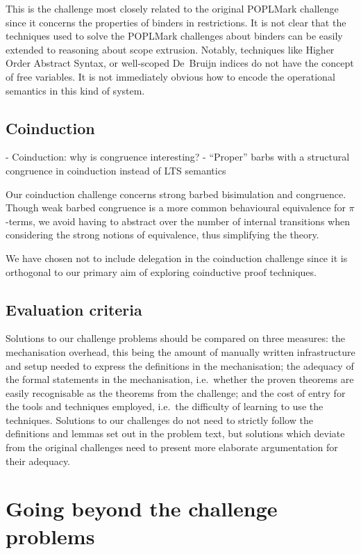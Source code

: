 \documentclass[runningheads]{llncs}
\begin{document}
This is the challenge most closely related to the original POPLMark
challenge since it concerns the properties of binders in restrictions.
It is not clear that the techniques used to solve the POPLMark challenges about binders can be easily extended to reasoning about scope extrusion.
Notably, techniques like Higher Order Abstract Syntax, or well-scoped
De\ Bruijn indices do not have the concept of free variables. It is
not immediately obvious how to encode the operational semantics in
this kind of system.


\subsection{Coinduction}
- Coinduction: why is congruence interesting?
- ``Proper'' barbs with a structural congruence in coinduction instead of LTS semantics

Our coinduction challenge concerns strong barbed bisimulation and congruence.
Though weak barbed congruence is a more common behavioural equivalence for \(\pi\)-terms, we avoid having to abstract over the number of internal transitions when considering the strong notions of equivalence, thus simplifying the theory.

We have chosen not to include delegation in the coinduction challenge since it is orthogonal to our primary aim of exploring coinductive proof techniques.

\subsection{Evaluation criteria}
Solutions to our challenge problems should be compared on three measures: the mechanisation overhead, this being the amount of manually written infrastructure and setup needed to express the definitions in the mechanisation; the adequacy of the formal statements in the mechanisation, i.e.\ whether the proven theorems are easily recognisable as the theorems from the challenge; and the cost of entry for the tools and techniques employed, i.e.\ the difficulty of learning to use the techniques.
Solutions to our challenges do not need to strictly follow the definitions and lemmas set out in the problem text, but solutions which deviate from the original challenges need to present more elaborate argumentation for their adequacy.


\section{Going beyond the challenge problems}\label{sec:going-beyond}
\end{document}
